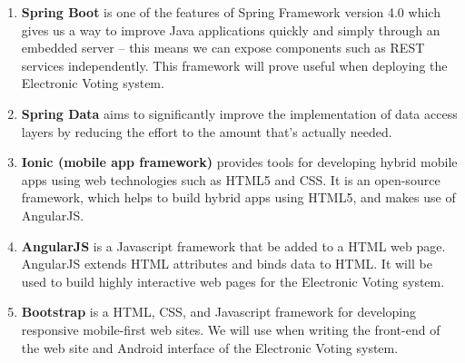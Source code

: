 \begin{enumerate}

		\item \textbf{Spring Boot} is one of the features of Spring Framework version 4.0 which gives us a way to improve Java applications quickly and simply through an embedded server – this means we can expose components such as REST services independently. This framework will prove useful when deploying the Electronic Voting system. 
		
		\item \textbf{Spring Data} aims to significantly improve the implementation of data access layers by reducing the effort to the amount that's actually needed.
		
		\item \textbf{Ionic (mobile app framework)} provides tools for developing hybrid mobile apps using web technologies such as HTML5 and CSS. It is an open-source framework, which helps to build hybrid apps using HTML5, and makes use of AngularJS. 
		
		\item \textbf{AngularJS} is a Javascript framework that be added to a HTML web page. AngularJS extends HTML attributes and binds data to HTML. It will be used to build highly interactive web pages for the Electronic Voting system. 
		
		\item \textbf{Bootstrap} is a HTML, CSS, and Javascript framework for developing responsive mobile-first web sites. We will use when writing the front-end of the web site and Android interface of the Electronic Voting system. 
		
		
\end{enumerate} 